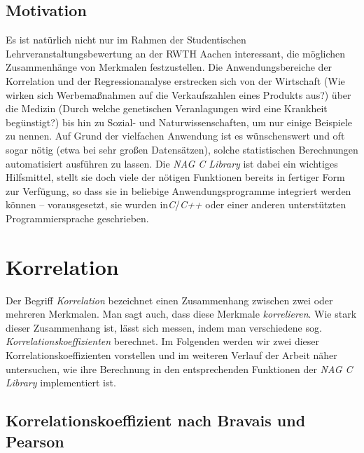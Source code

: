 \documentclass{article}
\begin{document}
\subsection{Motivation}

Es ist natürlich nicht nur im Rahmen der Studentischen Lehrveranstaltungsbewertung an der RWTH Aachen interessant, die möglichen Zusammenhänge von Merkmalen festzustellen. Die Anwendungsbereiche der Korrelation und der Regressionanalyse erstrecken sich von der Wirtschaft (Wie wirken sich Werbemaßnahmen auf die Verkaufszahlen eines Produkts aus?) über die Medizin (Durch welche genetischen Veranlagungen wird eine Krankheit begünstigt?) bis hin zu Sozial- und Naturwissenschaften, um nur einige Beispiele zu nennen. Auf Grund der vielfachen Anwendung ist es wünschenswert und oft sogar nötig (etwa bei sehr großen Datensätzen), solche statistischen Berechnungen automatisiert ausführen zu lassen. Die {\it NAG C Library} ist dabei ein wichtiges Hilfsmittel, stellt sie doch viele der nötigen Funktionen bereits in fertiger Form zur Verfügung, so dass sie in beliebige Anwendungsprogramme integriert werden können -- vorausgesetzt, sie wurden in{\it C}/{\it C++} oder einer anderen unterstützten Programmiersprache geschrieben.

\section{Korrelation}

Der Begriff {\it Korrelation} bezeichnet einen Zusammenhang zwischen zwei oder mehreren Merkmalen. Man sagt auch, dass diese Merkmale {\it korrelieren}. Wie stark dieser Zusammenhang ist, lässt sich messen, indem man verschiedene sog. {\it Korrelationskoeffizienten} berechnet. Im Folgenden werden wir zwei dieser Korrelationskoeffizienten vorstellen und im weiteren Verlauf der Arbeit näher untersuchen, wie ihre Berechnung in den entsprechenden Funktionen der {\it NAG C Library} implementiert ist.

\subsection{Korrelationskoeffizient nach Bravais und Pearson}
\end{document}
